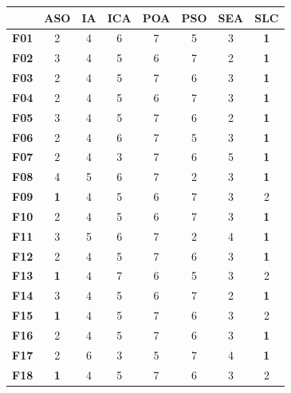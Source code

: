 \begin{table}
	\centering
	\begin{tabular}{cccccccc}
		\toprule
		{} &    \textbf{ASO} &     \textbf{IA} &    \textbf{ICA} &    \textbf{POA} &    \textbf{PSO} &    \textbf{SEA} &    \textbf{SLC} \\
		\midrule
		\textbf{F01}  &      2 &      4 &      6 &      7 &      5 &      3 &      \textbf{1} \\
		\textbf{F02}  &      3 &      4 &      5 &      6 &      7 &      2 &      \textbf{1} \\
		\textbf{F03}  &      2 &      4 &      5 &      7 &      6 &      3 &      \textbf{1} \\
		\textbf{F04}  &      2 &      4 &      5 &      6 &      7 &      3 &      \textbf{1} \\
		\textbf{F05}  &      3 &      4 &      5 &      7 &      6 &      2 &      \textbf{1} \\
		\midrule
		\textbf{F06}  &      2 &      4 &      6 &      7 &      5 &      3 &      \textbf{1} \\
		\textbf{F07}  &      2 &      4 &      3 &      7 &      6 &      5 &      \textbf{1} \\
		\textbf{F08}  &      4 &      5 &      6 &      7 &      2 &      3 &      \textbf{1} \\
		\textbf{F09}  &      \textbf{1} &      4 &      5 &      6 &      7 &      3 &      2 \\
		\textbf{F10}  &      2 &      4 &      5 &      6 &      7 &      3 &      \textbf{1} \\
		\textbf{F11}  &      3 &      5 &      6 &      7 &      2 &      4 &      \textbf{1} \\
		\textbf{F12}  &      2 &      4 &      5 &      7 &      6 &      3 &      \textbf{1} \\
		\midrule
		\textbf{F13}  &      \textbf{1} &      4 &      7 &      6 &      5 &      3 &      2 \\
		\textbf{F14}  &      3 &      4 &      5 &      6 &      7 &      2 &      \textbf{1} \\
		\midrule
		\textbf{F15}  &      \textbf{1} &      4 &      5 &      7 &      6 &      3 &      2 \\
		\textbf{F16}  &      2 &      4 &      5 &      7 &      6 &      3 &      \textbf{1} \\
		\textbf{F17}  &      2 &      6 &      3 &      5 &      7 &      4 &      \textbf{1} \\
		\textbf{F18}  &      \textbf{1} &      4 &      5 &      7 &      6 &      3 &      2 \\

\end{tabular}
\end{table}

